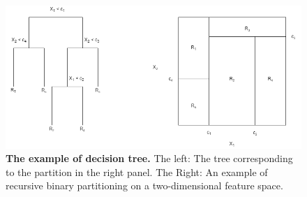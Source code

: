 \begin{figure}[ht]
\begin{center}
\includegraphics[scale=0.5]{./images/decision_tree_example}
\caption{{\bf The example of decision tree.} The left: The tree corresponding to the partition in the right panel. The Right: An example of recursive binary partitioning on a two-dimensional feature space.\setlength{\baselineskip}{1.25em}}
\label{fig_decision_tree_example}
\end{center}
\end{figure}